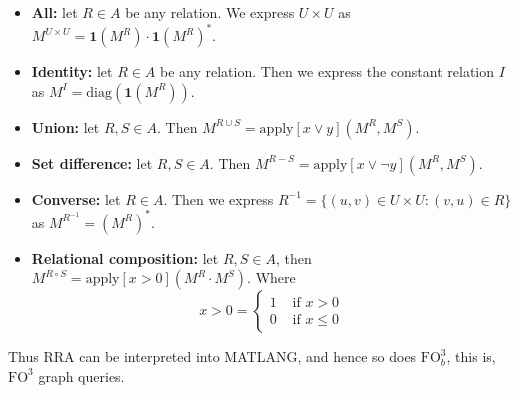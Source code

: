 \begin{itemize}
	\item \textbf{All:} let $R\in A$ be any relation. We express $U\times U$ as $M^{U\times U}=\mathbf{1}(M^R)\cdot\mathbf{1}(M^R)^*.$
	\item \textbf{Identity:} let $R\in A$ be any relation. Then we express the constant relation $I$ as $M^I=\text{diag}(\mathbf{1}(M^R)).$
	\item \textbf{Union:} let $R,S\in A$. Then $M^{R\cup S}=\text{apply}[x\vee y](M^R,M^S).$
	\item \textbf{Set difference:} let $R,S\in A$. Then $M^{R-S}=\text{apply}[x\vee\neg y](M^R, M^S).$
	\item \textbf{Converse:} let $R\in A$. Then we express $R^{-1}=\lbrace (u,v)\in U\times U: (v,u)\in R\rbrace$ as $M^{R^{-1}}=(M^R)^*.$
	\item \textbf{Relational composition:} let $R,S\in A$, then $M^{R\circ S}=\text{apply}[x>0](M^R\cdot M^S).$ Where 
	\[ x>0=
    \begin{cases} 
      1 & \text{ if } x>0 \\
      0 & \text{ if } x\leq 0 
    \end{cases}
	\]
\end{itemize}

Thus RRA can be interpreted into MATLANG,  and hence so does $\text{FO}^3_b$, this is, $\text{FO}^3$ graph queries.

